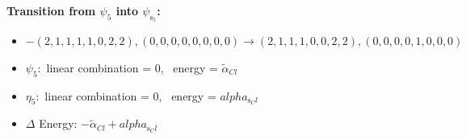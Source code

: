 \documentclass[12pt,a4paper]{article}
\begin{document}
        \noindent\textbf{Transition from $\psi_{5}$ into $\psi_{\text{s}_{5}}$:}
        \begin{itemize}
            \item $- (2, 1, 1, 1, 1, 0, 2, 2), (0, 0, 0, 0, 0, 0, 0, 0) \rightarrow (2, 1, 1, 1, 0, 0, 2, 2), (0, 0, 0, 0, 1, 0, 0, 0)$
        
            \item $\psi_{5}:$ linear combination = $0$, \
            energy = $\tilde{\alpha}_{Cl}$
            
            \item $\eta_{5}:$ linear combination = $0$, \
            energy = $alpha_{\text{s}_Cl}$
            
                \item $\Delta$ Energy: $- \tilde{\alpha}_{Cl} + alpha_{\text{s}_Cl}$

\end{itemize}
\end{document}

